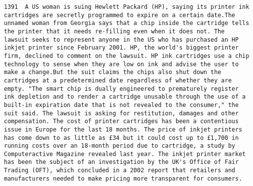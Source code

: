 \documentclass[11pt]{article}
\begin{document}
\begin{Verbatim}[commandchars=\\\{\}]
         1391  A US woman is suing Hewlett Packard (HP), saying its printer ink cartridges are secretly programmed to expire on a certain date.The unnamed woman from Georgia says that a chip inside the cartridge tells the printer that it needs re-filling even when it does not. The lawsuit seeks to represent anyone in the US who has purchased an HP inkjet printer since February 2001. HP, the world's biggest printer firm, declined to comment on the lawsuit. HP ink cartridges use a chip technology to sense when they are low on ink and advise the user to make a change.But the suit claims the chips also shut down the cartridges at a predetermined date regardless of whether they are empty. "The smart chip is dually engineered to prematurely register ink depletion and to render a cartridge unusable through the use of a built-in expiration date that is not revealed to the consumer," the suit said. The lawsuit is asking for restitution, damages and other compensation. The cost of printer cartridges has been a contentious issue in Europe for the last 18 months. The price of inkjet printers has come down to as little as £34 but it could cost up to £1,700 in running costs over an 18-month period due to cartridge, a study by Computeractive Magazine revealed last year. The inkjet printer market has been the subject of an investigation by the UK's Office of Fair Trading (OFT), which concluded in a 2002 report that retailers and manufacturers needed to make pricing more transparent for consumers.                                                                                                                                                                                                                                                                                                                                                                                                                                                                                                                                                                                                                                                                                                                                                                                                                                                                                                                                                                                                                                                                                                                                                                                                                                                                                                                                                                                                                                                                                                                                                                                                                                                                                                                                                                                                                                                                 
\end{Verbatim}
\end{document}
